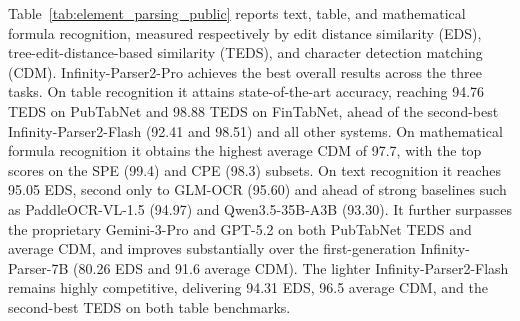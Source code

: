 Table~\ref{tab:element_parsing_public} reports text, table, and mathematical formula recognition, measured respectively by edit distance similarity (EDS), tree-edit-distance-based similarity (TEDS), and character detection matching (CDM). Infinity-Parser2-Pro achieves the best overall results across the three tasks. On table recognition it attains state-of-the-art accuracy, reaching 94.76 TEDS on PubTabNet and 98.88 TEDS on FinTabNet, ahead of the second-best Infinity-Parser2-Flash (92.41 and 98.51) and all other systems. On mathematical formula recognition it obtains the highest average CDM of 97.7, with the top scores on the SPE (99.4) and CPE (98.3) subsets. On text recognition it reaches 95.05 EDS, second only to GLM-OCR (95.60) and ahead of strong baselines such as PaddleOCR-VL-1.5 (94.97) and Qwen3.5-35B-A3B (93.30). It further surpasses the proprietary Gemini-3-Pro and GPT-5.2 on both PubTabNet TEDS and average CDM, and improves substantially over the first-generation Infinity-Parser-7B (80.26 EDS and 91.6 average CDM). The lighter Infinity-Parser2-Flash remains highly competitive, delivering 94.31 EDS, 96.5 average CDM, and the second-best TEDS on both table benchmarks.

